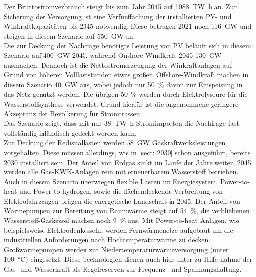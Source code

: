 		Der Bruttostromverbrauch steigt bis zum Jahr 2045 auf \SI{1088}{\tera \watt \hour} an. Zur Sicherung der Versorgung ist eine Verfünffachung der installierten PV- und Winkraftkapazitäten bis 2045 notwendig. Diese betrugen 2021 noch \SI{116}{\giga \watt} und steigen in diesem Szenario auf \SI{550}{\giga \watt} an.\cite{ESRa_Fraunhofer}\\
		Die zur Deckung der Nachfrage benötigte Leistung von PV beläuft sich in diesem Szenario auf \SI{400}{\giga \watt} 2045, während Onshore-Windkraft 2045 \SI{130}{\giga \watt} ausmachen. Dennoch ist die Nettostromerzeugung der Winkraftanlagen auf Grund von höheren Volllaststunden etwas größer. Offshore-Windkraft machen in diesem Szenario \SI{40}{\giga \watt} aus, wobei jedoch nur \SI{50}{\percent} davon zur Einspeisung in das Netz genutzt werden. Die übrigen \SI{50}{\percent} werden durch Elektrolyseure für die Wasserstoffsynthese verwendet. Grund hierfür ist die angenommene geringere Akzeptanz der Bevölkerung für Stromtrassen.\\
		Das Szenario zeigt, dass mit nur \SI{38}{\tera \watt \hour} Stromimporten die Nachfrage fast vollständig inländisch gedeckt werden kann.\cite{ESRa_Fraunhofer}\\
		
		Zur Deckung der Redisuallasten werden \SI{58}{\giga \watt} Gaskraftwerksleistungen vorgehalten. Diese müssen allerdings, wie in \ref{sect: 2030} schon ausgeführt, bereits 2030 installiert sein. Der Anteil von Erdgas sinkt im Laufe der Jahre weiter. 2045 werden alle Gas-KWK-Anlagen rein mit erneuerbarem Wasserstoff betrieben.\cite{ESRa_Fraunhofer}\\
		
		Auch in diesem Szenario überwiegen flexible Lasten im Energiesystem. Power-to-heat und Power-to-hydrogen, sowie die flächendeckende Verbreitung von Elektrofahrzeugen prägen die energetische Landschaft in 2045. Der Anteil von Wärmepumpen zur Bereitung von Raumwärme steigt auf \SI{54}{\percent}, die verbliebenen Wasserstoff-Gaskessel machen noch \SI{9}{\percent} aus. Mit Power-to-heat Anlagen, wie beispielsweise Elektrodenkesseln, werden Fernwärmenetze aufgebaut um die industriellen Anforderungen nach Hochtemperaturwärme zu decken. Großwärmepumpen werden zur Niedertemperaturwärmeversorgung (unter \SI{100}{\degreeCelsius}) eingesetzt. Diese Technologien dienen auch hier unter zu Hilfe nahme der Gas- und Wasserkraft als Regelreserven zur Frequenz- und Spannungshaltung.\cite{ESRa_Fraunhofer}\\
		
